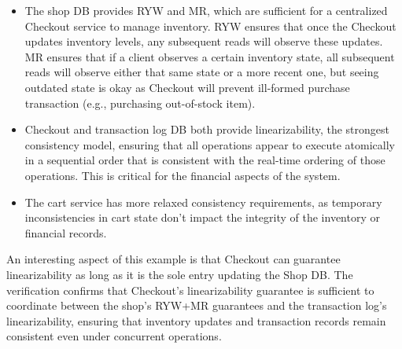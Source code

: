 \begin{itemize}
\item The shop DB provides RYW and MR, which are sufficient for
  a centralized Checkout service to manage inventory.
  RYW ensures that once the Checkout updates inventory levels,
  any subsequent reads will observe these updates. MR ensures that
  if a client observes a certain inventory state, all subsequent
  reads will observe either that same state or a more recent one,
  but seeing outdated state is okay as Checkout will prevent
  ill-formed purchase transaction (e.g., purchasing out-of-stock item).

\item Checkout and transaction log DB both provide
  linearizability, the strongest consistency model, ensuring that
  all operations appear to execute atomically in a sequential order
  that is consistent with the real-time ordering of those
  operations. This is critical for the financial aspects of the system.

\item The cart service has more relaxed consistency requirements,
  as temporary inconsistencies in cart state don't impact the
  integrity of the inventory or financial records.
\end{itemize}

An interesting aspect of this example is that Checkout can guarantee
linearizability as long as it is the sole entry updating the Shop DB.
The verification confirms that Checkout's linearizability
guarantee is sufficient to coordinate between the shop's RYW+MR
guarantees and the transaction log's linearizability, ensuring that
inventory updates and transaction records remain consistent even
under concurrent operations.

